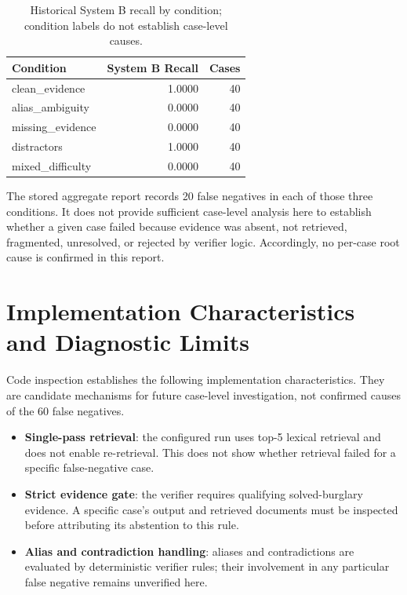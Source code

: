\documentclass[11pt,a4paper]{article}
\begin{document}
\begin{table}[h]
\centering
\begin{tabular}{l r r}
\toprule
Condition & System B Recall & Cases \\
\midrule
clean\_evidence & 1.0000 & 40 \\
alias\_ambiguity & 0.0000 & 40 \\
missing\_evidence & 0.0000 & 40 \\
distractors & 1.0000 & 40 \\
mixed\_difficulty & 0.0000 & 40 \\
\bottomrule
\end{tabular}
\caption{Historical System B recall by condition; condition labels do not establish case-level causes.}
\end{table}

The stored aggregate report records 20 false negatives in each of those three conditions. It does not provide sufficient case-level analysis here to establish whether a given case failed because evidence was absent, not retrieved, fragmented, unresolved, or rejected by verifier logic. Accordingly, no per-case root cause is confirmed in this report.

\section{Implementation Characteristics and Diagnostic Limits}

Code inspection establishes the following implementation characteristics. They are candidate mechanisms for future case-level investigation, not confirmed causes of the 60 false negatives.

\begin{itemize}[leftmargin=1.5em]
  \item \textbf{Single-pass retrieval}: the configured run uses top-5 lexical retrieval and does not enable re-retrieval. This does not show whether retrieval failed for a specific false-negative case.
  \item \textbf{Strict evidence gate}: the verifier requires qualifying solved-burglary evidence. A specific case's output and retrieved documents must be inspected before attributing its abstention to this rule.
  \item \textbf{Alias and contradiction handling}: aliases and contradictions are evaluated by deterministic verifier rules; their involvement in any particular false negative remains unverified here.
\end{itemize}
\end{document}
